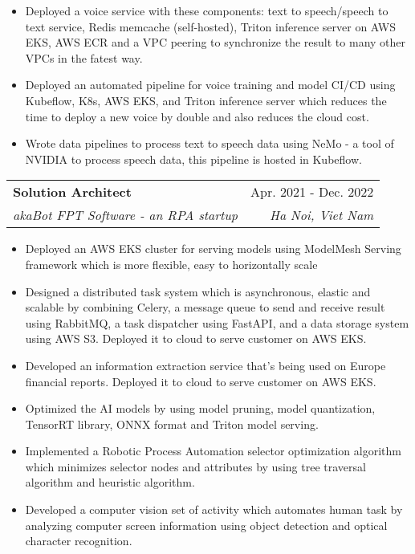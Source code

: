 \documentclass[letterpaper,11pt]{article}
\makeatletter
\newcommand{\resumeItem}[1]{
  \item\small{
    {#1 \vspace{-2pt}}
  }
}
\newcommand{\resumeSubheading}[4]{
  \vspace{-2pt}\item
    \begin{tabular*}{0.97\textwidth}[t]{l@{\extracolsep{\fill}}r}
      \textbf{#1} & #2 \\
      \textit{\small#3} & \textit{\small #4} \\
    \end{tabular*}\vspace{-7pt}
}
\newcommand{\resumeItemListStart}{\begin{itemize}}
\newcommand{\resumeItemListEnd}{\end{itemize}\vspace{-5pt}}
\makeatother
\begin{document}
  \resumeItemListStart
        \resumeItem { Deployed a voice service with these components: text to speech/speech to text service, Redis memcache (self-hosted), Triton inference server on AWS EKS, AWS ECR and a VPC peering to synchronize the result to many other VPCs in the fatest way.}
        \resumeItem {Deployed an automated pipeline for voice training and model CI/CD using Kubeflow, K8s, AWS EKS, and Triton inference server which reduces the time to deploy a new voice by double and also reduces the cloud cost.}
        \resumeItem {Wrote data pipelines to process text to speech data using NeMo - a tool of NVIDIA to process speech data, this pipeline is hosted in Kubeflow.}
     \resumeItemListEnd
  \resumeSubheading
    {Solution Architect}   {Apr. 2021 - Dec. 2022} 
    {akaBot FPT Software - an RPA startup} %
    {Ha Noi, Viet Nam} %
  
	\resumeItemListStart
	        \resumeItem {Deployed an AWS EKS cluster for serving models using ModelMesh Serving framework which is more flexible, easy to horizontally scale }
	        \resumeItem {Designed a distributed task system which is asynchronous, elastic and scalable by combining Celery, a message queue to send and receive result using RabbitMQ, a task dispatcher using FastAPI, and a data storage system using AWS S3. Deployed it to cloud to serve customer on AWS EKS.} 
	        \resumeItem {Developed an information extraction service that's being used on Europe financial reports. Deployed it to cloud to serve customer on AWS EKS.}
	        \resumeItem {Optimized the AI models by using model pruning, model quantization, TensorRT library, ONNX format and Triton model serving.}
	        \resumeItem {Implemented a Robotic Process Automation selector optimization algorithm which minimizes selector nodes and attributes by using tree traversal algorithm and heuristic algorithm.}
	        \resumeItem {Developed a computer vision set of activity which automates human task by analyzing computer screen information using object detection and optical character recognition.}
       \resumeItemListEnd
\end{document}
